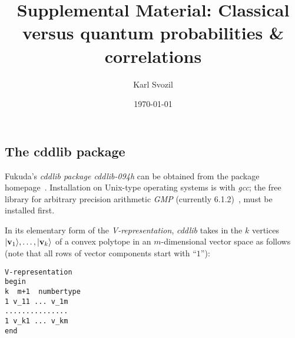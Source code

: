 \documentclass[%
  twocolumn,
 showpacs,
 showkeys,
 preprintnumbers,
 amsmath,amssymb,
 aps,
  pra,
  longbibliography,
 floatfix,
 ]{revtex4-1}
\begin{document}
\title{Supplemental Material: Classical versus quantum probabilities \& correlations}


\author{Karl Svozil}



\date{\today}


\maketitle

\subsection{The cddlib package}
\fi




Fukuda's {\em cddlib package cddlib-094h} can be obtained from the package homepage~\cite{cdd-pck}. Installation on Unix-type operating systems is with {\em gcc};
the free library for arbitrary precision arithmetic {\em GMP} (currently 6.1.2)~\cite{gmplib}, must be installed first.

In its elementary form of the  {\em V-representation},  {\em cddlib}
takes in the $k$ vertices $\vert {\bf v}_1 \rangle , \ldots , \vert {\bf v}_k \rangle$ of a convex polytope in an $m$-dimensional
vector space as follows (note that all rows of vector components start with ``$1$''):

\begin{lstlisting}[backgroundcolor=\color{yellow!10},framerule=0pt,breaklines=true, frame=tb]
V-representation
begin
k  m+1  numbertype
1 v_11 ... v_1m
...............
1 v_k1 ... v_km
end
\end{lstlisting}
\end{document}
